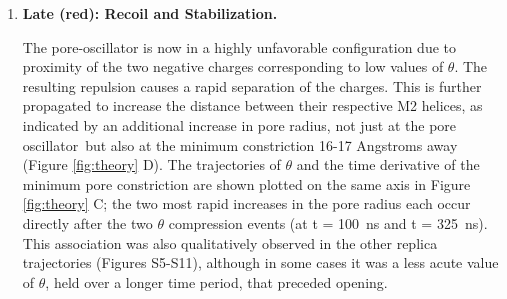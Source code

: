 \documentclass[journal=jacsat,manuscript=article]{achemso}
\newcommand{\sFigReplicas}{S5-S11}
\newcommand{\fiveringnos}{interfacial band}
\newcommand{\triad}{pore oscillator~}
\begin{document}
\begin{enumerate}
\begin{enumerate}
\item  t=300-330~ns: Upon weakening of favorable electrostatic interactions with positively charged residues in the \triad and \fiveringnos,  the two negative sidechains of the \triad pivot around their $C_{\alpha}$ atom to face away from the $\gamma$ subunit.  This switches the \triad charge-dipole interaction from attractive to repulsive, as tracked by $\theta$ in Figure \ref{fig:Pillar_2_graphs_network} C and according to Eq.  \ref{eq:triad}; for small values of $\theta$, the distance between the two negatively charged residues becomes particularly small (Figure  \ref{fig:Pillar_2_graphs_network}). %
\end{enumerate}

\item {\bf Late (red): Recoil and Stabilization.} 

The pore-oscillator is now in a highly unfavorable configuration due to proximity of the two negative charges corresponding to low values of $\theta$.  %
The resulting repulsion causes a rapid separation of the charges. This is further propagated to increase the distance between their respective M2 helices, as indicated by an additional increase in pore radius, not just %
at the \triad but also at the minimum constriction 16-17 Angstroms away  (Figure \ref{fig:theory} D). 
The trajectories of $\theta$ and the time derivative of the minimum pore constriction are shown plotted on the same axis in Figure \ref{fig:theory} C; the two most rapid increases in the pore radius each occur directly after the two $\theta$ compression events (at t = 100~ns and t = 325~ns).  This association was also qualitatively observed in the other replica trajectories (Figures \sFigReplicas), although in some cases it was a less acute value of $\theta$, held over a longer time period, that preceded opening.  


\end{enumerate}
\end{document}
